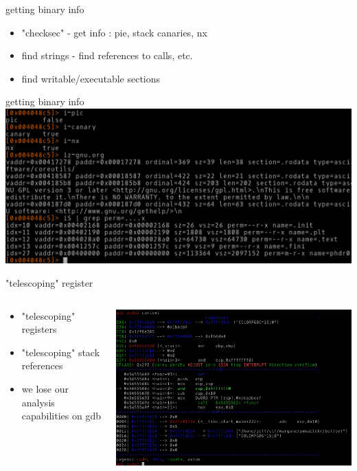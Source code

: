 \documentclass[10pt,pdf,utf8,english,compress,hyperref={unicode}]{beamer}
\begin{document}
\begin{frame}{getting binary info}
	\begin{itemize}
		\item "checksec" - get info : pie, stack canaries, nx
		\item find strings - find references to calls, etc.
		\item find writable/executable sections
	\end{itemize}
\end{frame}

\begin{frame}{getting binary info}
	\includegraphics[width=\textwidth]{crimages/bin-info.png}
\end{frame}

\begin{frame}{"telescoping" register}
	\begin{columns}
		\begin{column}{.3\textwidth}
			\begin{itemize}
				\item "telescoping" registers
				\item "telescoping" stack references
				\item we lose our analysis capabilities on gdb
			\end{itemize}
		\end{column}
		\begin{column}{.7\textwidth}
			\includegraphics[width=\textwidth]{crimages/peda_context.png}
		\end{column}
	\end{columns}
\end{frame}
\end{document}
